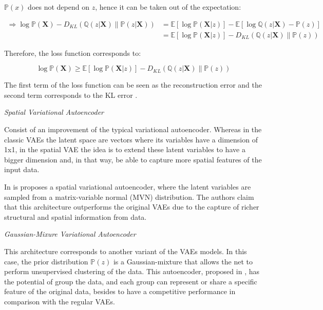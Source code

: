 \begin{math}\mathbb{P}(x)\end{math} does not depend on \begin{math}z\end{math}, hence it can be taken out of the expectation:

\begin{equation}
 \begin{aligned} \Longrightarrow \log \mathbb{P}(\mathbf{X})-D_{KL}(\mathbb{Q}(z | \mathbf{X}) \| \mathbb{P}(z | \mathbf{X})) &=\mathbb{E}[\log \mathbb{P}(\mathbf{X} | z)]-\mathbb{E}[\log \mathbb{Q}(z | \mathbf{X})-\mathbb{P}(z)] \\ &=\mathbb{E}[\log \mathbb{P}(\mathbf{X} | z)]-D_{KL}(\mathbb{Q}(z | \mathbf{X}) \| \mathbb{P}(z)) \end{aligned}
\end{equation}

Therefore, the loss function corresponds to:

\begin{equation}
 \log \mathbb{P}(\mathbf{X}) \geq \mathbb{E}[\log \mathbb{P}(\mathbf{X} | z)]-D_{KL}(\mathbb{Q}(z | \mathbf{X}) \| \mathbb{P}(z))
\end{equation}

The first term of the loss function can be seen as the reconstruction error and the second term corresponds to the KL error \cite{Doersch2016}.

\textit{Spatial Variational Autoencoder}

Consist of an improvement of the typical variational autoencoder. Whereas in the classic VAEs the latent space are vectors where its variables have a dimension of 1x1, in the spatial VAE the idea is to extend these latent variables to have a bigger dimension and, in that way, be able to capture more spatial features of the input data.

In \cite{Wang2019} is proposes a spatial variational autoencoder, where the latent variables are sampled from a matrix-variable normal (MVN) distribution. The authors claim that this architecture outperforms the original VAEs due to the capture of richer structural and spatial information from data.

\textit{Gaussian-Mixure Variational Autoencoder}

This architecture corresponds to another variant of the VAEs models. In this case, the prior distribution \begin{math}\mathbb{P}(z)\end{math} is a Gaussian-mixture that allows the net to perform unsupervised clustering of the data. This autoencoder, proposed in \cite{Dilokthanakul2016}, has the potential of group the data, and each group can represent or share a specific feature of the original data, besides to have a competitive performance in comparison with the regular VAEs.

